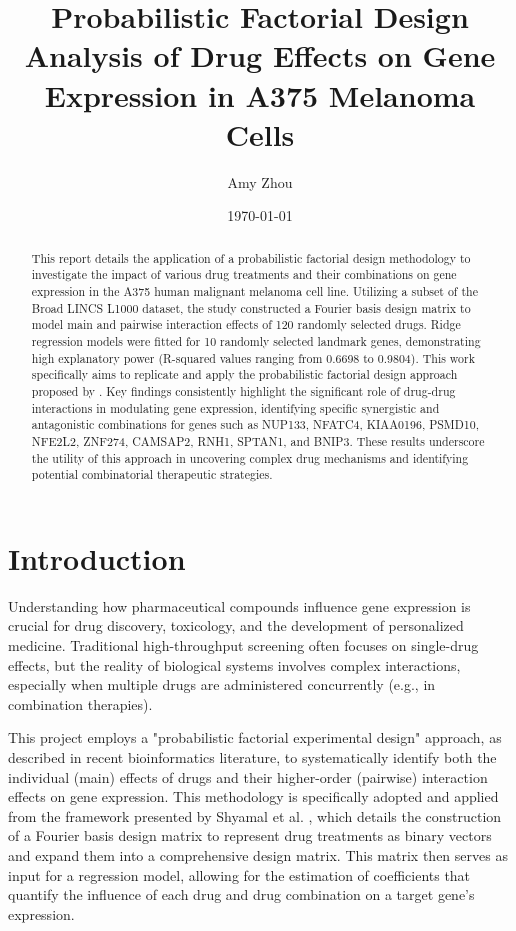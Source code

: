 \documentclass[12pt]{article}
\title{Probabilistic Factorial Design Analysis of Drug Effects on Gene Expression in A375 Melanoma Cells}
\author{Amy Zhou}
\date{\today}
\begin{document}
\maketitle

\begin{abstract}
This report details the application of a probabilistic factorial design methodology to investigate the impact of various drug treatments and their combinations on gene expression in the A375 human malignant melanoma cell line. Utilizing a subset of the Broad LINCS L1000 dataset, the study constructed a Fourier basis design matrix to model main and pairwise interaction effects of 120 randomly selected drugs. Ridge regression models were fitted for 10 randomly selected landmark genes, demonstrating high explanatory power (R-squared values ranging from 0.6698 to 0.9804). This work specifically aims to replicate and apply the probabilistic factorial design approach proposed by \textcite{shyamal2024probabilistic}. Key findings consistently highlight the significant role of drug-drug interactions in modulating gene expression, identifying specific synergistic and antagonistic combinations for genes such as NUP133, NFATC4, KIAA0196, PSMD10, NFE2L2, ZNF274, CAMSAP2, RNH1, SPTAN1, and BNIP3. These results underscore the utility of this approach in uncovering complex drug mechanisms and identifying potential combinatorial therapeutic strategies.
\end{abstract}

\section{Introduction}

Understanding how pharmaceutical compounds influence gene expression is crucial for drug discovery, toxicology, and the development of personalized medicine. Traditional high-throughput screening often focuses on single-drug effects, but the reality of biological systems involves complex interactions, especially when multiple drugs are administered concurrently (e.g., in combination therapies).

This project employs a "probabilistic factorial experimental design" approach, as described in recent bioinformatics literature, to systematically identify both the individual (main) effects of drugs and their higher-order (pairwise) interaction effects on gene expression. This methodology is specifically adopted and applied from the framework presented by Shyamal et al. \cite{shyamal2024probabilistic}, which details the construction of a Fourier basis design matrix to represent drug treatments as binary vectors and expand them into a comprehensive design matrix. This matrix then serves as input for a regression model, allowing for the estimation of coefficients that quantify the influence of each drug and drug combination on a target gene's expression.
\end{document}
